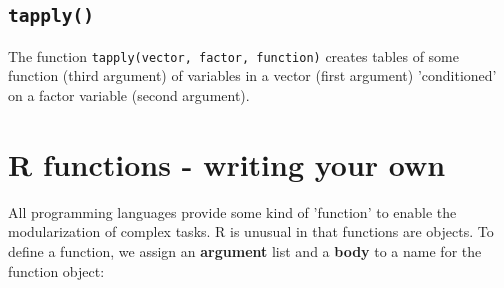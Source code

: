 \documentclass[titlepage]{book}\usepackage{knitr}
\begin{document}
\subsection{\texttt{tapply()}}
The function \texttt{tapply(vector, factor, function)} creates tables of some function (third argument) of variables in a vector (first argument) 'conditioned' on a factor variable (second argument).
\begin{knitrout}
\color{fgcolor}\begin{kframe}
\begin{alltt}
   \hlkwb{<-} \hlopt{$}\hlopt{$}  \hlstd{=} \hlstd{)}
 \hlkwb{<-} \hlopt{$}\hlopt{$}   \hlstd{=} \hlstd{)}
   \hlkwb{<-} \hlopt{$}\hlopt{$}   \hlstd{=} \hlstd{)}
 \hlkwb{<-} \hlopt{$}\hlopt{$}   \hlstd{=} \hlstd{)}
      \hlkwb{<-} \hlopt{$}\hlopt{$}   \hlstd{=} \hlstd{)}
    \hlkwb{<-} \hlopt{$}\hlopt{$}   \hlstd{=} \hlstd{)}
  
\end{alltt}
\end{kframe}
\end{knitrout}



\section{R functions - writing your own}\label{ownFunction}
All programming languages provide some kind of 'function' to enable the modularization of complex tasks. R is unusual in that functions are objects. To define a function, we assign an \textbf{argument} list and a \textbf{body} to a name for the function object:

\begin{knitrout}
\color{fgcolor}\begin{kframe}
\begin{alltt}
 \hlkwb{<-} \hlstd{(} \hlstd{=} \hlstd{,}  \hlstd{=} \hlstd{)\{}
  \hlopt{*}\hlopt{*}
  \hlstd{\}}
 \hlkwb{<-} 
 \hlkwb{<-} 
\end{alltt}
\end{kframe}
\end{knitrout}
\end{document}

